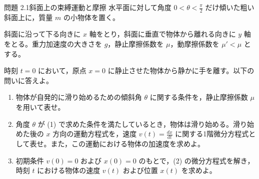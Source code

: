 \problemstart
{}

\begin{problemBox}{問題 2.1\quad 斜面上の束縛運動と摩擦\hspace{1.2em}{\small\mdseries 〔基本〕}}
水平面に対して角度 $0 < \theta < \frac{\pi}{2}$ だけ傾いた粗い斜面上に，質量 $m$ の小物体を置く。
\par
斜面に沿って下る向きに $x$ 軸をとり，斜面に垂直で物体から離れる向きに $y$ 軸をとる。重力加速度の大きさを $g$，静止摩擦係数を $\mu$，動摩擦係数を $\mu'<\mu$ とする。
\par
時刻 $t = 0$ において，原点 $x = 0$ に静止させた物体から静かに手を離す。以下の問いに答えよ。

\begin{enumerate}
  \item 物体が自発的に滑り始めるための傾斜角 $\theta$ に関する条件を，静止摩擦係数 $\mu$ を用いて表せ。

  \item 角度 $\theta$ が (1) で求めた条件を満たしているとき，物体は滑り始める。滑り始めた後の $x$ 方向の運動方程式を，速度 $v(t) = \frac{dx}{dt}$ に関する1階微分方程式として表せ。また，この運動における物体の加速度を求めよ。

  \item 初期条件 $v(0) = 0$ および $x(0) = 0$ のもとで，(2) の微分方程式を解き，時刻 $t$ における物体の速度 $v(t)$ および位置 $x(t)$ を求めよ。
\end{enumerate}
\end{problemBox}

